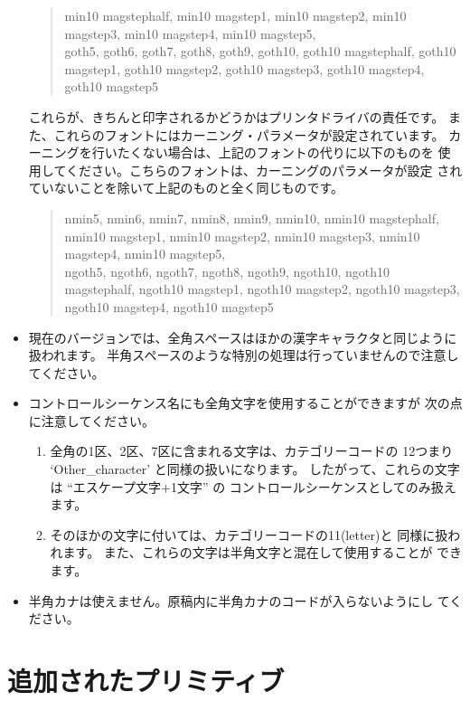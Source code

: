 \begin{itemize}
\begin{quote}
	min10 magstephalf, min10 magstep1,
	min10 magstep2, min10 magstep3,
	min10 magstep4, min10 magstep5, \\
	goth5, goth6, goth7, goth8, goth9, goth10,
	goth10 magstephalf, goth10 magstep1,
	goth10 magstep2, goth10 magstep3,
	goth10 magstep4, goth10 magstep5
	\end{quote}
	これらが、きちんと印字されるかどうかはプリンタドライバの責任です。
	また、これらのフォントにはカーニング・パラメータが設定されています。
	カーニングを行いたくない場合は、上記のフォントの代りに以下のものを
	使用してください。こちらのフォントは、カーニングのパラメータが設定
	されていないことを除いて上記のものと全く同じものです。
	\begin{quote}
	nmin5, nmin6, nmin7, nmin8, nmin9, nmin10,
	nmin10 magstephalf, nmin10 magstep1,
	nmin10 magstep2, nmin10 magstep3,
	nmin10 magstep4, nmin10 magstep5, \\
	ngoth5, ngoth6, ngoth7, ngoth8, ngoth9, ngoth10,
	ngoth10 magstephalf, ngoth10 magstep1,
	ngoth10 magstep2, ngoth10 magstep3,
	ngoth10 magstep4, ngoth10 magstep5
	\end{quote}
\item 現在のバージョンでは、全角スペースはほかの漢字キャラクタと同じように
	扱われます。
	半角スペースのような特別の処理は行っていませんので注意してください。
\item コントロールシーケンス名にも全角文字を使用することができますが
	次の点に注意してください。
	\begin{enumerate}
	\item 全角の1区、2区、7区に含まれる文字は、カテゴリーコードの
		12つまり `Other\_character' と同様の扱いになります。
		したがって、これらの文字は ``エスケープ文字$+$1文字'' の
		コントロールシーケンスとしてのみ扱えます。
	\item そのほかの文字に付いては、カテゴリーコードの11(letter)と
		同様に扱われます。
		また、これらの文字は半角文字と混在して使用することが
		できます。
	\end{enumerate}
\item 半角カナは使えません。原稿内に半角カナのコードが入らないようにし
	てください。
\end{itemize}

\section{追加されたプリミティブ}


